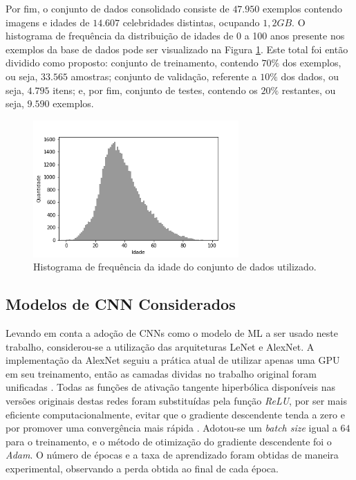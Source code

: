 Por fim, o conjunto de dados consolidado consiste de $47.950$ exemplos contendo imagens e idades de $14.607$ celebridades distintas, ocupando $1,2 GB$. O histograma de frequência da distribuição de idades de 0 a 100 anos presente nos exemplos da base de dados pode ser visualizado na Figura \ref{fig:hist}. Este total foi então dividido como proposto: conjunto de treinamento, contendo $70\%$ dos exemplos, ou seja, $33.565$ amostras; conjunto de validação, referente a $10\%$ dos dados, ou seja, $4.795$ itens; e, por fim, conjunto de testes, contendo os $20\%$ restantes, ou seja, $9.590$ exemplos.

\begin{figure}
    \centering
     \includegraphics[width=0.7\textwidth]{img/idade_hist_clean}
     \caption{Histograma de frequência da idade do conjunto de dados utilizado.}
     \label{fig:hist}
\end{figure}

\subsection{Modelos de CNN Considerados} \label{subsec:modelos}
Levando em conta a adoção de CNNs como o modelo de ML a ser usado neste trabalho, considerou-se a utilização das arquiteturas LeNet e AlexNet. A implementação da AlexNet seguiu a prática atual de utilizar apenas uma GPU em seu treinamento, então as camadas dividas no trabalho original foram unificadas \cite{tensorflow:alexnet}. Todas as funções de ativação tangente hiperbólica disponíveis nas versões originais destas redes foram substituídas pela função \emph{ReLU}, por ser mais eficiente computacionalmente, evitar que o gradiente descendente tenda a zero e por promover uma convergência mais rápida \cite{maas2013rectifier}. Adotou-se um \emph{batch size} igual a $64$ para o treinamento, e o método de otimização do gradiente descendente foi o \emph{Adam}. O número de épocas e a taxa de aprendizado foram obtidas de maneira experimental, observando a perda obtida ao final de cada época.

